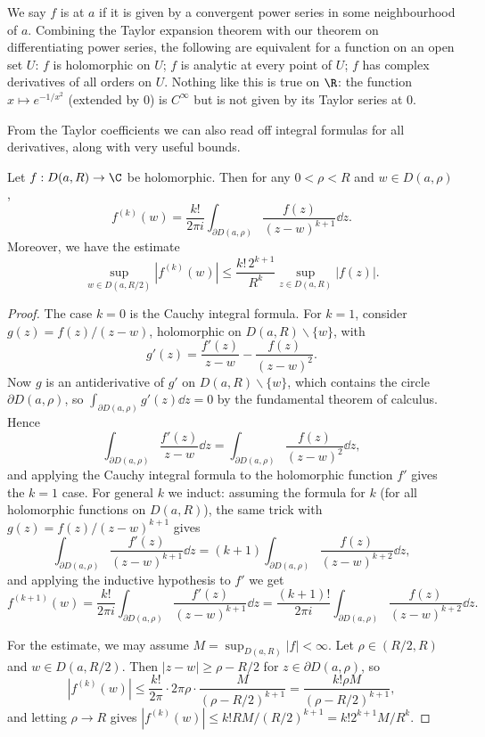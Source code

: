 \begin{remark}[Holomorphic = Analytic]
    We say $f$ is  at $a$ if it is given by a convergent power series in some neighbourhood of $a$. Combining the Taylor expansion theorem with our theorem on differentiating power series, the following are equivalent for a function on an open set $U$: $f$ is holomorphic on $U$; $f$ is analytic at every point of $U$; $f$ has complex derivatives of all orders on $U$. Nothing like this is true on $\R$: the function $x \mapsto e^{-1/x^2}$ (extended by $0$) is $C^\infty$ but is not given by its Taylor series at $0$.
\end{remark}

From the Taylor coefficients we can also read off integral formulas for all derivatives, along with very useful bounds.

\begin{theorem}
    Let $f: D(a, R) \rightarrow \C$ be holomorphic. Then for any $0 < \rho < R$ and $w \in D(a, \rho)$,
    $$
    f^{(k)}(w) = \frac{k!}{2 \pi i} \int_{\partial D(a, \rho)} \frac{f(z)}{(z - w)^{k + 1}} \dd z.
    $$
    Moreover, we have the estimate
    $$
    \sup_{w \in D(a, R/2)} |f^{(k)}(w)| \leq \frac{k! \, 2^{k + 1}}{R^k} \sup_{z \in D(a, R)} |f(z)|.
    $$
\end{theorem}
\begin{proof}
    The case $k = 0$ is the Cauchy integral formula. For $k = 1$, consider $g(z) = f(z)/(z - w)$, holomorphic on $D(a, R) \backslash \{w\}$, with
    $$
    g'(z) = \frac{f'(z)}{z - w} - \frac{f(z)}{(z - w)^2}.
    $$
    Now $g$ is an antiderivative of $g'$ on $D(a, R) \backslash \{w\}$, which contains the circle $\partial D(a, \rho)$, so $\int_{\partial D(a, \rho)} g'(z) \dd z = 0$ by the fundamental theorem of calculus. Hence
    $$
    \int_{\partial D(a, \rho)} \frac{f'(z)}{z - w} \dd z = \int_{\partial D(a, \rho)} \frac{f(z)}{(z - w)^2} \dd z,
    $$
    and applying the Cauchy integral formula to the holomorphic function $f'$ gives the $k = 1$ case. For general $k$ we induct: assuming the formula for $k$ (for all holomorphic functions on $D(a,R)$), the same trick with $g(z) = f(z)/(z - w)^{k + 1}$ gives
    $$
    \int_{\partial D(a, \rho)} \frac{f'(z)}{(z - w)^{k + 1}} \dd z = (k + 1)\int_{\partial D(a, \rho)} \frac{f(z)}{(z - w)^{k + 2}} \dd z,
    $$
    and applying the inductive hypothesis to $f'$ we get
    $$
    f^{(k + 1)}(w) = \frac{k!}{2 \pi i} \int_{\partial D(a, \rho)} \frac{f'(z)}{(z - w)^{k + 1}} \dd z = \frac{(k + 1)!}{2 \pi i}\int_{\partial D(a, \rho)} \frac{f(z)}{(z - w)^{k + 2}} \dd z.
    $$

    For the estimate, we may assume $M = \sup_{D(a, R)}|f| < \infty$. Let $\rho \in (R/2, R)$ and $w \in D(a, R/2)$. Then $|z - w| \geq \rho - R/2$ for $z \in \partial D(a, \rho)$, so
    $$
    |f^{(k)}(w)| \leq \frac{k!}{2 \pi} \cdot 2 \pi \rho \cdot \frac{M}{(\rho - R/2)^{k + 1}} = \frac{k! \rho M}{(\rho - R/2)^{k + 1}},
    $$
    and letting $\rho \rightarrow R$ gives $|f^{(k)}(w)| \leq k! R M/(R/2)^{k + 1} = k! 2^{k + 1} M / R^{k}$.
\end{proof}

